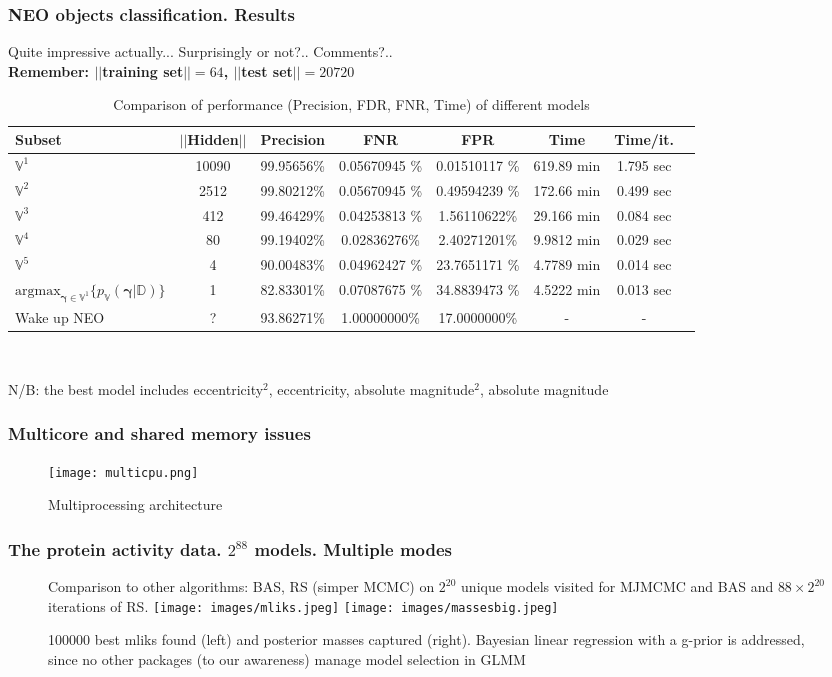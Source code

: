 \documentclass{beamer}
\begin{document}
\begin{frame}
\frametitle{NEO objects classification. Results}
\begin{center}
Quite impressive actually... Surprisingly or not?.. Comments?..\\
\textbf{Remember: $||$training set$||=64$, $||$test set$||=20720$}
\end{center}

\tiny
\begin{table}[t]
\begin{tabular}{ 
|l|c|c|c|c|c|c|c|}
\hline
Subset&$||$Hidden$||$&Precision&FNR&FPR&Time&Time/it.\\\hline
$\mathbb{V}^1$&10090&99.95656\%&0.05670945
\%&0.01510117
\%&619.89 min&1.795 sec\\
$\mathbb{V}^2$&2512&99.80212\%&0.05670945
\%&0.49594239
\%&172.66 min&0.499 sec\\
$\mathbb{V}^3$&412&99.46429\%&0.04253813
\%&1.56110622\%&29.166 min&0.084 sec\\
$\mathbb{V}^4$&80&99.19402\%&0.02836276\%&2.40271201\%&9.9812 min&0.029 sec\\
$\mathbb{V}^5$&4&90.00483\%& 0.04962427
\%&23.7651171
\%&4.7789 min&0.014 sec\\
$\text{argmax}_{\boldsymbol{\gamma} \in \mathbb{V}^1}\{{p_{\mathbb{V}}(\boldsymbol{\gamma}|\mathbb{D})}\}$&1& 82.83301\%& 0.07087675
\%&34.8839473
\%&4.5222 min&0.013 sec\\
Wake up NEO &?&93.86271\%&1.00000000\%&17.0000000\%&-&-\\\hline

\end{tabular}
\\[1pt]
\caption{Comparison of performance (Precision, FDR, FNR, Time) of different models}
\end{table}

N/B: the best model includes eccentricity$^2$, eccentricity, absolute magnitude$^2$, absolute magnitude 
\end{frame}

\begin{frame}
\frametitle{Multicore and shared memory issues}

\begin{figure}
\texttt{[image: multicpu.png]}
\caption{Multiprocessing architecture}
\end{figure}
\end{frame}

\begin{frame}
\frametitle{The protein activity data. $2^{88}$ models. Multiple modes}
\begin{figure}
Comparison to other algorithms: BAS, RS (simper MCMC) on $2^{20}$ unique models visited for MJMCMC and BAS and $88\times 2^{20}$ iterations of RS.
\texttt{[image: images/mliks.jpeg]}
\texttt{[image: images/massesbig.jpeg]}
\caption{100000 best mliks found (left) and posterior masses captured ({right}). Bayesian linear regression with a g-prior is addressed, since no other packages (to our awareness) manage model selection in GLMM}
\end{figure}

\end{frame}
\end{document}
